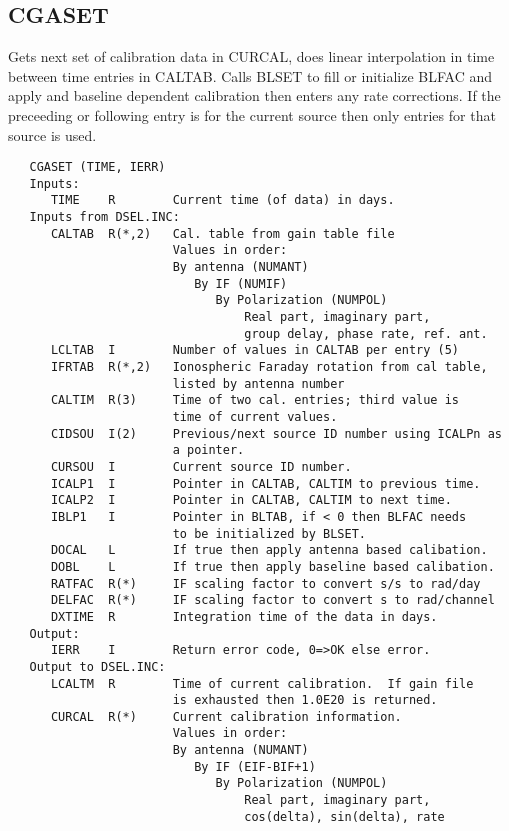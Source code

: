 \subsection{CGASET}
Gets next set of calibration data in CURCAL, does linear
interpolation in time between time entries in CALTAB.
Calls BLSET to fill or initialize BLFAC and apply and baseline
dependent calibration then enters any rate corrections.
   If the preceeding or following entry is for the current source
then only entries for that source is used.
\begin{verbatim}
   CGASET (TIME, IERR)
   Inputs:
      TIME    R        Current time (of data) in days.
   Inputs from DSEL.INC:
      CALTAB  R(*,2)   Cal. table from gain table file
                       Values in order:
                       By antenna (NUMANT)
                          By IF (NUMIF)
                             By Polarization (NUMPOL)
                                 Real part, imaginary part,
                                 group delay, phase rate, ref. ant.
      LCLTAB  I        Number of values in CALTAB per entry (5)
      IFRTAB  R(*,2)   Ionospheric Faraday rotation from cal table,
                       listed by antenna number
      CALTIM  R(3)     Time of two cal. entries; third value is
                       time of current values.
      CIDSOU  I(2)     Previous/next source ID number using ICALPn as
                       a pointer.
      CURSOU  I        Current source ID number.
      ICALP1  I        Pointer in CALTAB, CALTIM to previous time.
      ICALP2  I        Pointer in CALTAB, CALTIM to next time.
      IBLP1   I        Pointer in BLTAB, if < 0 then BLFAC needs
                       to be initialized by BLSET.
      DOCAL   L        If true then apply antenna based calibation.
      DOBL    L        If true then apply baseline based calibation.
      RATFAC  R(*)     IF scaling factor to convert s/s to rad/day
      DELFAC  R(*)     IF scaling factor to convert s to rad/channel
      DXTIME  R        Integration time of the data in days.
   Output:
      IERR    I        Return error code, 0=>OK else error.
   Output to DSEL.INC:
      LCALTM  R        Time of current calibration.  If gain file
                       is exhausted then 1.0E20 is returned.
      CURCAL  R(*)     Current calibration information.
                       Values in order:
                       By antenna (NUMANT)
                          By IF (EIF-BIF+1)
                             By Polarization (NUMPOL)
                                 Real part, imaginary part,
                                 cos(delta), sin(delta), rate

\end{verbatim}
